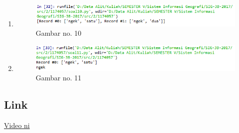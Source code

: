 \begin{enumerate}
    \item 
	
	\begin{figure}[H]
		\includegraphics[width=12cm]{figures/1174057/fajar10.PNG}
		\centering
		\caption{Gambar no. 10}
	\end{figure}

	\item 
	
	\begin{figure}[H]
		\includegraphics[width=12cm]{figures/1174057/fajar11.PNG}
		\centering
		\caption{Gambar no. 11}
	\end{figure}
\end{enumerate}

\subsection{Link}
\href{https://www.youtube.com/watch?v=PxCZFZzLivM&t=96s}{Video ni}